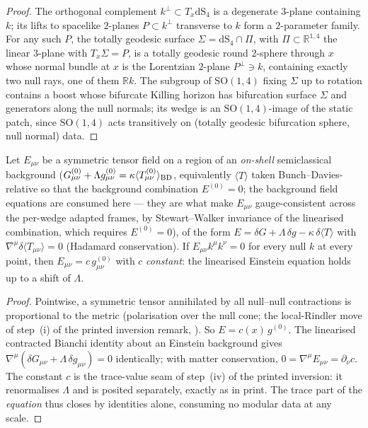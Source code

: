 \begin{proof}
The orthogonal complement $k^{\perp}\subset T_x\mathrm{dS}_4$ is a
degenerate $3$-plane containing $k$; its lifts to spacelike
$2$-planes $P\subset k^{\perp}$ transverse to $k$ form a
$2$-parameter family. For any such $P$, the totally geodesic surface
$\Sigma=\mathrm{dS}_4\cap\Pi$, with $\Pi\subset\mathbb R^{1,4}$ the
linear $3$-plane with $T_x\Sigma=P$, is a totally geodesic round
$2$-sphere through $x$ whose normal bundle at $x$ is the Lorentzian
$2$-plane $P^{\perp}\ni k$, containing exactly two null rays, one of
them $\mathbb Rk$. The subgroup of $\mathrm{SO}(1,4)$ fixing $\Sigma$
up to rotation contains a boost whose bifurcate Killing horizon has
bifurcation surface $\Sigma$ and generators along the null normals;
its wedge is an $\mathrm{SO}(1,4)$-image of the static patch, since
$\mathrm{SO}(1,4)$ acts transitively on (totally geodesic bifurcation
sphere, null normal) data.
\end{proof}

\begin{lemma}
\label{lem:e0ds-trace}
Let $E_{\mu\nu}$ be a symmetric tensor field on a region of an
\emph{on-shell} semiclassical background
($G^{(0)}_{\mu\nu}+\Lambda g^{(0)}_{\mu\nu}
=\kappa\langle T^{(0)}_{\mu\nu}\rangle_{\rm BD}$, equivalently
$\langle T\rangle$ taken Bunch--Davies-relative so that the
background combination $E^{(0)}=0$; the background field equations
are consumed here --- they are what make $E_{\mu\nu}$
gauge-consistent across the per-wedge adapted frames, by
Stewart--Walker invariance of the linearised combination, which
requires $E^{(0)}=0$), of the
form $E=\delta G+\Lambda\,\delta g-\kappa\,\delta\langle T\rangle$
with $\nabla^{\mu}\delta\langle T_{\mu\nu}\rangle=0$ (Hadamard
conservation). If $E_{\mu\nu}k^{\mu}k^{\nu}=0$ for every null $k$ at
every point, then $E_{\mu\nu}=c\,g^{(0)}_{\mu\nu}$ with $c$
\emph{constant}: the linearised Einstein equation holds up to a
shift of $\Lambda$.
\end{lemma}

\begin{proof}
Pointwise, a symmetric tensor annihilated by all null--null
contractions is proportional to the metric (polarisation over the
null cone; the local-Rindler move of step~(i) of the printed
inversion remark, \cite{Jacobson1995}). So $E=c(x)\,g^{(0)}$. The
linearised contracted Bianchi identity about an Einstein background
gives $\nabla^{\mu}(\delta G_{\mu\nu}+\Lambda\,\delta g_{\mu\nu})=0$
identically; with matter conservation,
$0=\nabla^{\mu}E_{\mu\nu}=\partial_{\nu}c$. The constant $c$ is the
trace-value seam of step~(iv) of the printed inversion: it
renormalises $\Lambda$ and is posited separately, exactly as in
print. The trace part of the \emph{equation} thus closes by
identities alone, consuming no modular data at any scale.
\end{proof}

